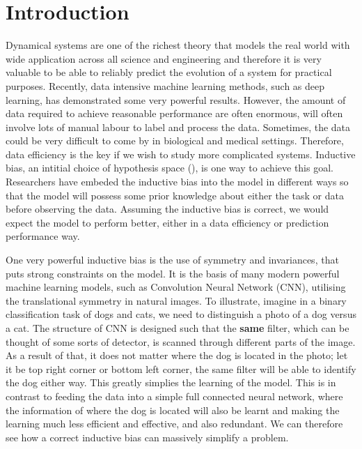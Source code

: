 \documentclass{statsmsc}
\begin{document}
\chapter{Introduction}
Dynamical systems are one of the richest theory that models the real world with wide application across all science and engineering and therefore it is very valuable to be able to reliably predict the evolution of a system for practical purposes.
Recently, data intensive machine learning methods, such as deep learning, has demonstrated some very powerful results. 
However, the amount of data required to achieve reasonable performance are often enormous, will often involve lots of manual labour to label and process the data.
Sometimes, the data could be very difficult to come by in biological and medical settings.
Therefore, data efficiency is the key if we wish to study more complicated systems.
Inductive bias, an intitial choice of hypothesis space (\cite{Baxter2000}), is one way to achieve this goal.
Researchers have embeded the inductive bias into the model in different ways so that the model will possess some prior knowledge about either the task or data before observing the data.
Assuming the inductive bias is correct, we would expect the model to perform better, either in a data efficiency or prediction performance way.

One very powerful inductive bias is the use of symmetry and invariances, that puts strong constraints on the model. 
It is the basis of many modern powerful machine learning models, such as Convolution Neural Network (CNN), utilising the translational symmetry in natural images.
To illustrate, imagine in a binary classification task of dogs and cats, we need to distinguish a photo of a dog versus a cat. 
The structure of CNN is designed such that the \textbf{same} filter, which can be thought of some sorts of detector, is scanned through different parts of the image.  
As a result of that, it does not matter where the dog is located in the photo; let it be top right corner or bottom left corner, the same filter will be able to identify the dog either way.
This greatly simplies the learning of the model.
This is in contrast to feeding the data into a simple full connected neural network, where the information of where the dog is located will also be learnt and making the learning much less efficient and effective, and also redundant.
We can therefore see how a correct inductive bias can massively simplify a problem.
\end{document}
